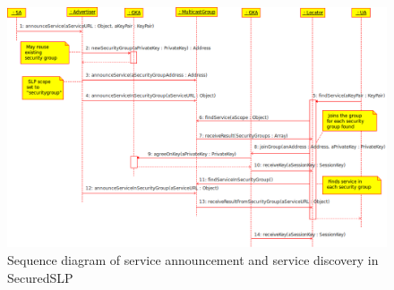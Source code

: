 \begin{figure}[!h]
\centering\includegraphics[scale=0.9,angle=90]{Images/SequenceDiagramm}
\caption{Sequence diagram of service announcement and service discovery in SecuredSLP}
\label{fig:SequenceDiagram}
\end{figure}